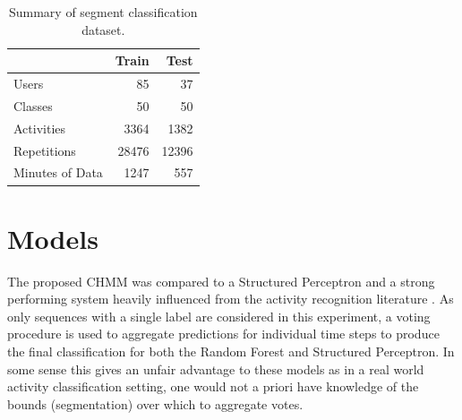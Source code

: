 \documentclass[12pt]{report}
\newcommand{\1}[0]{\mathbbm{1}}
\begin{document}
\begin{table}[ht]
    \centering
    \begin{tabular}{l r r}\hline
    & \textbf{Train} &\textbf{Test} \\\hline
    Users & 85 & 37\\
    Classes & 50 & 50\\
    Activities & 3364 & 1382\\
    Repetitions & 28476 & 12396\\
    Minutes of Data & 1247 & 557\\
    \end{tabular}
    \caption{Summary of segment classification dataset.}
    \label{table:segment-dataset}
\end{table}

\section{Models}
The proposed \ac{CHMM} was compared to a Structured Perceptron \cite{perceptron-collins}
and a strong performing system heavily influenced from the activity recognition literature \cite{ms-activity}. 
As only sequences with a single label are considered in this experiment, a voting procedure is used
to aggregate predictions for individual time steps to produce the final classification for both
the Random Forest and Structured Perceptron. In some sense this gives an unfair advantage to these
models as in a real world activity classification setting, one would not a priori have knowledge of
the bounds (segmentation) over which to aggregate votes.
\end{document}
